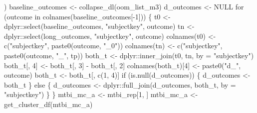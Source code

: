 \documentclass[
  letterpaper,
  DIV=11,
  numbers=noendperiod]{scrreprt}
\newenvironment{Shaded}{\begin{snugshade}}{\end{snugshade}}
\newcommand{\AttributeTok}[1]{\textcolor[rgb]{0.40,0.45,0.13}{#1}}
\newcommand{\ConstantTok}[1]{\textcolor[rgb]{0.56,0.35,0.01}{#1}}
\newcommand{\ControlFlowTok}[1]{\textcolor[rgb]{0.00,0.23,0.31}{#1}}
\newcommand{\DecValTok}[1]{\textcolor[rgb]{0.68,0.00,0.00}{#1}}
\newcommand{\FunctionTok}[1]{\textcolor[rgb]{0.28,0.35,0.67}{#1}}
\newcommand{\NormalTok}[1]{\textcolor[rgb]{0.00,0.23,0.31}{#1}}
\newcommand{\OtherTok}[1]{\textcolor[rgb]{0.00,0.23,0.31}{#1}}
\newcommand{\SpecialCharTok}[1]{\textcolor[rgb]{0.37,0.37,0.37}{#1}}
\newcommand{\StringTok}[1]{\textcolor[rgb]{0.13,0.47,0.30}{#1}}
\begin{document}
\begin{Shaded}
\begin{Highlighting}[]
\NormalTok{    )}
\NormalTok{    baseline\_outcomes }\OtherTok{\textless{}{-}} \FunctionTok{collapse\_dl}\NormalTok{(oom\_list\_m3)}
\NormalTok{    d\_outcomes }\OtherTok{\textless{}{-}} \ConstantTok{NULL}
    \ControlFlowTok{for}\NormalTok{ (outcome }\ControlFlowTok{in} \FunctionTok{colnames}\NormalTok{(baseline\_outcomes[}\SpecialCharTok{{-}}\DecValTok{1}\NormalTok{])) \{}
\NormalTok{        t0 }\OtherTok{\textless{}{-}}\NormalTok{ dplyr}\SpecialCharTok{::}\FunctionTok{select}\NormalTok{(baseline\_outcomes, }\StringTok{"subjectkey"}\NormalTok{, outcome)}
\NormalTok{        tn }\OtherTok{\textless{}{-}}\NormalTok{ dplyr}\SpecialCharTok{::}\FunctionTok{select}\NormalTok{(long\_outcomes, }\StringTok{"subjectkey"}\NormalTok{, outcome)}
        \FunctionTok{colnames}\NormalTok{(t0) }\OtherTok{\textless{}{-}} \FunctionTok{c}\NormalTok{(}\StringTok{"subjectkey"}\NormalTok{, }\FunctionTok{paste0}\NormalTok{(outcome, }\StringTok{"\_0"}\NormalTok{))}
        \FunctionTok{colnames}\NormalTok{(tn) }\OtherTok{\textless{}{-}} \FunctionTok{c}\NormalTok{(}\StringTok{"subjectkey"}\NormalTok{, }\FunctionTok{paste0}\NormalTok{(outcome, }\StringTok{"\_"}\NormalTok{, tp))}
\NormalTok{        both\_t }\OtherTok{\textless{}{-}}\NormalTok{ dplyr}\SpecialCharTok{::}\FunctionTok{inner\_join}\NormalTok{(t0, tn, }\AttributeTok{by =} \StringTok{"subjectkey"}\NormalTok{)}
\NormalTok{        both\_t[, }\DecValTok{4}\NormalTok{] }\OtherTok{\textless{}{-}}\NormalTok{ both\_t[, }\DecValTok{3}\NormalTok{] }\SpecialCharTok{{-}}\NormalTok{ both\_t[, }\DecValTok{2}\NormalTok{]}
        \FunctionTok{colnames}\NormalTok{(both\_t)[}\DecValTok{4}\NormalTok{] }\OtherTok{\textless{}{-}} \FunctionTok{paste0}\NormalTok{(}\StringTok{"d\_"}\NormalTok{, outcome)}
\NormalTok{        both\_t }\OtherTok{\textless{}{-}}\NormalTok{ both\_t[, }\FunctionTok{c}\NormalTok{(}\DecValTok{1}\NormalTok{, }\DecValTok{4}\NormalTok{)]}
        \ControlFlowTok{if}\NormalTok{ (}\FunctionTok{is.null}\NormalTok{(d\_outcomes)) \{}
\NormalTok{            d\_outcomes }\OtherTok{\textless{}{-}}\NormalTok{ both\_t}
\NormalTok{        \} }\ControlFlowTok{else}\NormalTok{ \{}
\NormalTok{            d\_outcomes }\OtherTok{\textless{}{-}}\NormalTok{ dplyr}\SpecialCharTok{::}\FunctionTok{full\_join}\NormalTok{(d\_outcomes, both\_t, }\AttributeTok{by =} \StringTok{"subjectkey"}\NormalTok{)}
\NormalTok{        \}}
\NormalTok{    \}}
\NormalTok{    mtbi\_mc\_a }\OtherTok{\textless{}{-}}\NormalTok{ mtbi\_rep[}\DecValTok{1}\NormalTok{, ]}
\NormalTok{    mtbi\_mc\_a }\OtherTok{\textless{}{-}} \FunctionTok{get\_cluster\_df}\NormalTok{(mtbi\_mc\_a)}

\end{Highlighting}
\end{Shaded}
\end{document}
